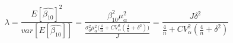 \begin{equation}
\label{eq:lambda}
\lambda = \frac{E[\hat{\beta_{10}}]^2}{var[E[\hat{\beta_{10}}]]} = \frac{\beta_{10}^2\mu_{\alpha}^2}{\frac{\sigma_0^2\mu_{\alpha}^2\Big(\frac{4}{n} + CV_{\alpha}^2(\frac{4}{n} + \delta^2)\Big)}{J}} = \frac{J\delta^2}{\frac{4}{n}+CV_{\alpha}^2(\frac{4}{n} + \delta^2)}
\end{equation}